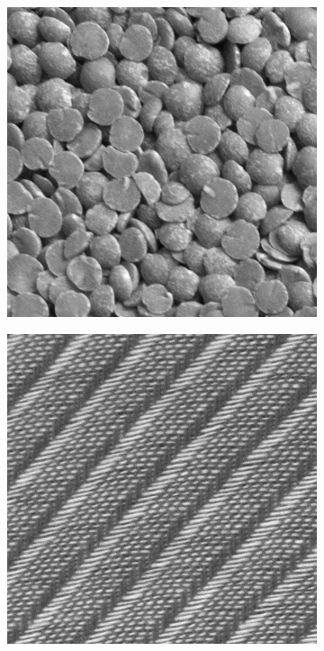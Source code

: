 \begin{figure}[h!]
\begin{subfigure}{.15\textwidth}
  \centering
  \includegraphics[width=.8\linewidth]{kylberg_examples/lentils1_001.png}
\end{subfigure}
\begin{subfigure}{.15\textwidth}
  \centering
  \includegraphics[width=.8\linewidth]{kylberg_examples/screen1_001.png}
\end{subfigure}


\end{figure}
